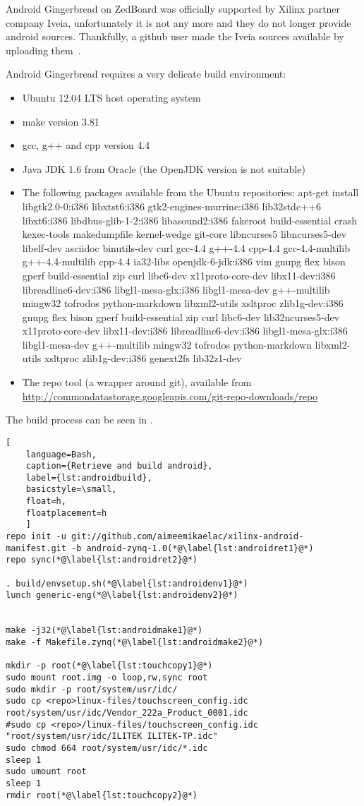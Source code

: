 Android Gingerbread on ZedBoard was officially supported by Xilinx partner
company Iveia, unfortunately it is not any more and they do not longer provide
android sources. Thankfully, a github user made the Iveia sources available by
uploading them~\cite{androidsource}.

Android Gingerbread requires a very delicate build environment:
\begin{itemize}
	\item Ubuntu 12.04 LTS host operating system
	\item make version 3.81
	\item gcc, g++ and cpp version 4.4
	\item Java JDK 1.6 from Oracle (the OpenJDK version is not suitable)
	\item The following packages available from the Ubuntu repositories:
		apt-get install libgtk2.0-0:i386 libxtst6:i386 gtk2-engines-murrine:i386
		lib32stdc++6 libxt6:i386 libdbus-glib-1-2:i386 libasound2:i386 fakeroot
		build-essential crash kexec-tools makedumpfile kernel-wedge git-core
		libncurses5 libncurses5-dev libelf-dev asciidoc binutils-dev curl
		gcc-4.4 g++-4.4 cpp-4.4 gcc-4.4-multilib g++-4.4-multilib cpp-4.4
		ia32-libs openjdk-6-jdk:i386 vim gnupg flex bison gperf build-essential
		zip curl libc6-dev x11proto-core-dev libx11-dev:i386
		libreadline6-dev:i386 libgl1-mesa-glx:i386 libgl1-mesa-dev g++-multilib
		mingw32 tofrodos python-markdown libxml2-utils xsltproc zlib1g-dev:i386
		gnupg flex bison gperf build-essential zip curl libc6-dev
		lib32ncurses5-dev x11proto-core-dev libx11-dev:i386
		libreadline6-dev:i386 libgl1-mesa-glx:i386 libgl1-mesa-dev
		g++-multilib mingw32 tofrodos python-markdown libxml2-utils xsltproc
		zlib1g-dev:i386 genext2fs lib32z1-dev
	\item The repo tool (a wrapper around git), available from\\
		\url{http://commondatastorage.googleapis.com/git-repo-downloads/repo}
\end{itemize}
The build process can be seen in .
\begin{lstlisting}[
	language=Bash,
	caption={Retrieve and build android},
	label={lst:androidbuild},
	basicstyle=\small,
	float=h,
	floatplacement=h
	]
repo init -u git://github.com/aimeemikaelac/xilinx-android-manifest.git -b android-zynq-1.0(*@\label{lst:androidret1}@*)
repo sync(*@\label{lst:androidret2}@*)

. build/envsetup.sh(*@\label{lst:androidenv1}@*)
lunch generic-eng(*@\label{lst:androidenv2}@*)


make -j32(*@\label{lst:androidmake1}@*)
make -f Makefile.zynq(*@\label{lst:androidmake2}@*)

mkdir -p root(*@\label{lst:touchcopy1}@*)
sudo mount root.img -o loop,rw,sync root
sudo mkdir -p root/system/usr/idc/
sudo cp <repo>linux-files/touchscreen_config.idc root/system/usr/idc/Vendor_222a_Product_0001.idc
#sudo cp <repo>/linux-files/touchscreen_config.idc "root/system/usr/idc/ILITEK ILITEK-TP.idc"
sudo chmod 664 root/system/usr/idc/*.idc
sleep 1
sudo umount root
sleep 1
rmdir root(*@\label{lst:touchcopy2}@*)
\end{lstlisting}
